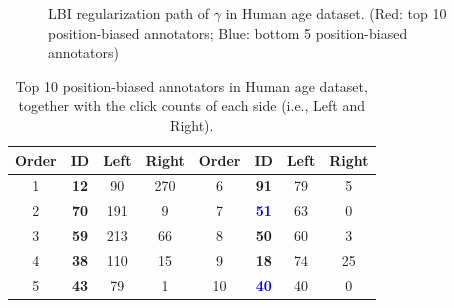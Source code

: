 \documentclass[10pt,journal,cspaper,compsoc]{IEEEtran}
\begin{document}
{\begin{figure}
 \begin{center}
  \caption{LBI regularization path of $\gamma$ in Human age dataset. (Red: top 10 position-biased annotators; Blue: bottom 5 position-biased annotators)}\label{fig:ageposition}
\end{center}
\end{figure}



{\renewcommand\baselinestretch{1.2}\selectfont
\setlength{\belowcaptionskip}{3pt}
\begin{table}[h]\caption{\label{tab:ageposition} Top 10 position-biased annotators in Human age dataset, together with the click counts of each side (i.e., Left and Right).}
\tiny
\centering
\newsavebox{\tablebox}
\begin{lrbox}{\tablebox}
\begin{tabular}{||c|c|c|c||c|c|c|c||}
  \hline  \textbf{Order} &\textbf{ID}   &\textbf{Left}  &\textbf{Right} & \textbf{Order} & \textbf{ID}   &\textbf{Left}  &\textbf{Right} \\
 \hline
\hline    1 & \textbf{12}	&90	&270  & 6 & \textbf{91}	&79	&5\\
\hline   2 & \textbf{70}	&191	&9 & 7 & \textcolor{blue}{\textbf{51}}	&63	&0\\
\hline    3 & \textbf{59}	&213	&66 & 8 & \textbf{50}	&60	&3 \\
\hline    4 & \textbf{38}	&110 &15  & 9 &\textbf{18}	&74	&25 \\
\hline    5 & \textbf{43}   &79 & 1 & 10 & \textcolor{blue}{\textbf{40}}	&40	&0   \\


\end{tabular}
\end{lrbox}
\end{table}}}
\end{document}
